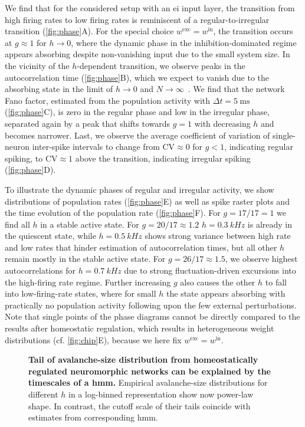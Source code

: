 We find that for the considered setup with an \gls{ei} input layer, the transition from high firing rates to low firing rates is reminiscent of a regular-to-irregular transition (\cref{fig:phase}A).
For the special choice $w^\mathrm{exc}=w^\mathrm{in}$, the transition occurs at $g\approx 1$ for $h\to0$, where the dynamic phase in the inhibition-dominated regime appears absorbing despite non-vanishing input due to the small system size.
In the vicinity of the $h$-dependent transition, we observe peaks in the autocorrelation time (\cref{fig:phase}B), which we expect to vanish due to the absorbing state in the limit of $h\to 0$ and $N\to\infty$~\cite{zierenberg_notitle_nodate}.
We find that the network Fano factor, estimated from the population activity with $\Delta t = \SI{5}{\milli\second}$ (\cref{fig:phase}C), is zero in the regular phase and low in the irregular phase, separated again by a peak that shifts towards $g=1$ with decreasing $h$ and becomes narrower.
Last, we observe the average coefficient of variation of single-neuron inter-spike intervals to change from $\text{CV}\approx 0$ for $g<1$, indicating regular spiking, to $\text{CV}\approx 1$ above the transition, indicating irregular spiking (\cref{fig:phase}D).

To illustrate the dynamic phases of regular and irregular activity, we show distributions of population rates (\cref{fig:phase}E) as well as spike raster plots and the time evolution of the population rate (\cref{fig:phase}F).
For $g=17/17=1$ we find all $h$ in a stable active state.
For $g=20/17\approx 1.2$ $h=\SI{0.3}{kHz}$ is already in the quiescent state, while $h=\SI{0.5}{kHz}$ shows strong variance between high rate and low rates that hinder estimation of autocorrelation times, but all other $h$ remain mostly in the stable active state.
For $g=26/17\approx 1.5$, we observe highest autocorrelations for $h=\SI{0.7}{kHz}$ due to strong fluctuation-driven excursions into the high-firing rate regime.
Further increasing $g$ also causes the other $h$ to fall into low-firing-rate states, where for small $h$ the state appears absorbing with practically no population activity following upon the few external perturbations.
Note that single points of the phase diagrams cannot be directly compared to the results after homeostatic regulation, which results in heterogeneous weight distributions (cf. \cref{fig:chip}E), because we here fix $w^\mathrm{exc}=w^\mathrm{in}$.

\begin{figure}[ht]
	\centering
	\caption{%
        \textbf{Tail of avalanche-size distribution from homeostatically regulated neuromorphic networks can be explained by the timescales of a \gls{hmm}.}
        Empirical avalanche-size distributions for different $h$ in a log-binned representation show now power-law shape.
        In contrast, the cutoff scale of their tails coincide with estimates from corresponding \gls{hmm}.
	}
	\label{fig:avalanches}
\end{figure}

